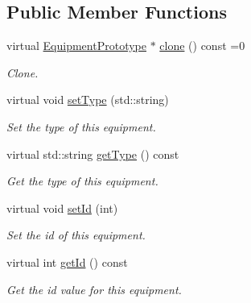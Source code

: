 \subsection*{Public Member Functions}
\begin{DoxyCompactItemize}
\item 
virtual \hyperlink{class_equipment_prototype}{Equipment\+Prototype} $\ast$ \hyperlink{class_equipment_prototype_a4014d69b92c71c4c49477c657c824024}{clone} () const  =0
\begin{DoxyCompactList}\small\item\em Clone. \end{DoxyCompactList}\item 
\hypertarget{class_equipment_prototype_aab050a04930f86328433401e7ad2d589}{}virtual void \hyperlink{class_equipment_prototype_aab050a04930f86328433401e7ad2d589}{set\+Type} (std\+::string)\label{class_equipment_prototype_aab050a04930f86328433401e7ad2d589}

\begin{DoxyCompactList}\small\item\em Set the type of this equipment. \end{DoxyCompactList}\item 
\hypertarget{class_equipment_prototype_af165565c75afeb2c4a214cb6dd2209b6}{}virtual std\+::string \hyperlink{class_equipment_prototype_af165565c75afeb2c4a214cb6dd2209b6}{get\+Type} () const \label{class_equipment_prototype_af165565c75afeb2c4a214cb6dd2209b6}

\begin{DoxyCompactList}\small\item\em Get the type of this equipment. \end{DoxyCompactList}\item 
\hypertarget{class_equipment_prototype_accf753d12a43903655f45baea8343f5a}{}virtual void \hyperlink{class_equipment_prototype_accf753d12a43903655f45baea8343f5a}{set\+Id} (int)\label{class_equipment_prototype_accf753d12a43903655f45baea8343f5a}

\begin{DoxyCompactList}\small\item\em Set the id of this equipment. \end{DoxyCompactList}\item 
\hypertarget{class_equipment_prototype_af34187c2a2552f0d6ee30de69a4b1a59}{}virtual int \hyperlink{class_equipment_prototype_af34187c2a2552f0d6ee30de69a4b1a59}{get\+Id} () const \label{class_equipment_prototype_af34187c2a2552f0d6ee30de69a4b1a59}

\begin{DoxyCompactList}\small\item\em Get the id value for this equipment. \end{DoxyCompactList}\end{DoxyCompactItemize}
